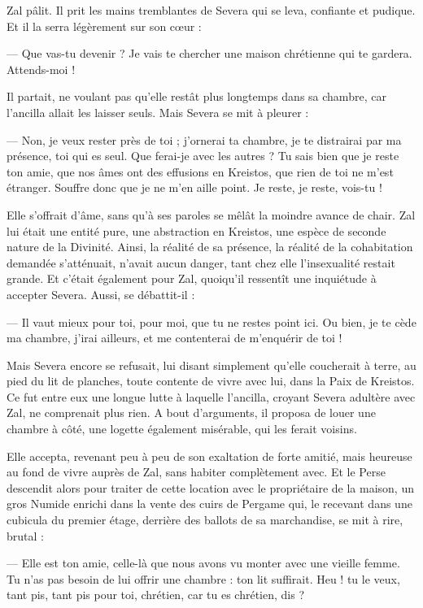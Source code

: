 \documentclass[a4paper, 11pt, oneside, polutonikogreek, french]{article}
\begin{document}
Zal pâlit. Il prit les mains tremblantes de Severa qui se leva, confiante et pudique. Et il la serra légèrement sur son cœur :

--- Que vas-tu devenir ? Je vais te chercher une maison chrétienne qui te gardera. Attends-moi !

Il partait, ne voulant pas qu'elle restât plus longtemps dans sa chambre, car l'ancilla allait les laisser seuls. Mais Severa se mit à pleurer :

--- Non, je veux rester près de toi ; j'ornerai ta chambre, je te distrairai par ma présence, toi qui es seul. Que ferai-je avec les autres ? Tu sais bien que je reste ton amie, que nos âmes ont des effusions en Kreistos, que rien de toi ne m'est étranger. Souffre donc que je ne m'en aille point. Je reste, je reste, vois-tu !

Elle s'offrait d'âme, sans qu'à ses paroles se mêlât la moindre avance de chair. Zal lui était une entité pure, une abstraction en Kreistos, une espèce de seconde nature de la Divinité. Ainsi, la réalité de sa présence, la réalité de la cohabitation demandée s'atténuait, n'avait aucun danger, tant chez elle l'insexualité restait grande. Et c'était également pour Zal, quoiqu'il ressentît une inquiétude à accepter Severa. Aussi, se débattit-il :

--- Il vaut mieux pour toi, pour moi, que tu ne restes point ici. Ou bien, je te cède ma chambre, j'irai ailleurs, et me contenterai de m'enquérir de toi !

Mais Severa encore se refusait, lui disant simplement qu'elle coucherait à terre, au pied du lit de planches, toute contente de vivre avec lui, dans la Paix de Kreistos. Ce fut entre eux une longue lutte à laquelle l'ancilla, croyant Severa adultère avec Zal, ne comprenait plus rien. A bout d'arguments, il proposa de louer une chambre à côté, une logette également misérable, qui les ferait voisins.

Elle accepta, revenant peu à peu de son exaltation de forte amitié, mais heureuse au fond de vivre auprès de Zal, sans habiter complètement avec. Et le Perse descendit alors pour traiter de cette location avec le propriétaire de la maison, un gros Numide enrichi dans la vente des cuirs de Pergame qui, le recevant dans une cubicula du premier étage, derrière des ballots de sa marchandise, se mit à rire, brutal :

--- Elle est ton amie, celle-là que nous avons vu monter avec une vieille femme. Tu n'as pas besoin de lui offrir une chambre : ton lit suffirait. Heu ! tu le veux, tant pis, tant pis pour toi, chrétien, car tu es chrétien, dis ?
\end{document}
